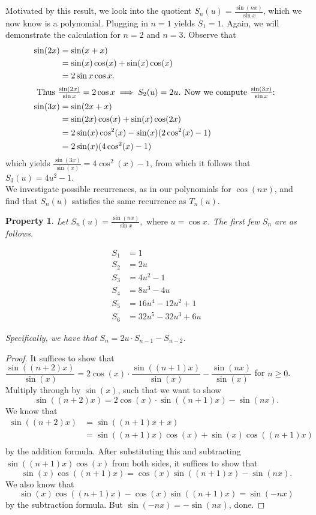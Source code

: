 \documentclass[12pt, letterpaper]{article} %
\newtheorem{theorem}{Property}
\begin{document}
Motivated by this result, we look into the quotient $S_n(u) = \frac{\sin (nx)}{\sin x}$, which we now know is a polynomial. Plugging in $n = 1$ yields $S_1 = 1$. Again, we will demonstrate the calculation for $n = 2$ and $n=3$. Observe that
\begin{align*}
\sin (2x) & = \sin (x + x) \\
 & = \sin (x) \cos(x) + \sin (x)\cos(x) \\
 & = 2\sin x \cos x. \\
\intertext{
Thus $\frac{\sin(2x)}{\sin{x}} = 2\cos x \implies S_2(u) = 2u$. Now we compute $\frac{\sin(3x)}{\sin x}$:
}
\sin(3x) & = \sin(2x + x) \\
    & = \sin(2x) \cos(x) + \sin(x)\cos(2x) \\
    & = 2\sin(x) \cos^2(x) - \sin(x)(2\cos^2(x) - 1) \\
    & = 2\sin(x) (4\cos^2(x) - 1) \\
\end{align*}
which yields $\frac{\sin(3x)}{\sin(x)} = 4\cos^2(x) - 1$, from which it follows that $S_3(u) = 4u^2 - 1$. \\

We investigate possible recurrences, as in our polynomials for $\cos (nx)$, and find that $S_n(u)$ satisfies the same recurrence as $T_n(u)$.

\begin{theorem}
Let $S_{n}(u)=\frac{\sin(nx)}{\sin{x}},\text{ where } u = \cos x$. The first few $S_{n}$ are as follows.

\begin{align*}
S_{1} &= 1 \\
S_{2} &= 2u \\
S_{3} &= 4u^{2} -1 \\
S_{4} &= 8u^{3} - 4u \\
S_{5} &= 16u^{4} - 12u^{2} + 1 \\
S_{6} &= 32u^{5} - 32u^{3} + 6u
\end{align*}

Specifically, we have that $S_{n} = 2u\cdot S_{n-1} - S_{n-2}$.
\end{theorem}

\begin{proof}
It suffices to show that $\dfrac{\sin ((n+2)x)}{\sin(x)} = 2\cos (x) \cdot \dfrac{\sin ((n+1)x)}{\sin (x)} - \dfrac{\sin (nx)}{\sin (x)}$ for $n \ge 0$. Multiply through by $\sin (x)$, such that we want to show
$$\sin ((n+2)x) = 2\cos (x) \cdot \sin ((n+1)x) - \sin (nx).$$
We know that
\begin{align*}
\sin((n+2)x) & = \sin((n+1)x + x) \\
& = \sin((n+1)x)\cos(x) + \sin(x)\cos((n+1)x) \\
\end{align*}
by the addition formula. After substituting this and subtracting $\sin((n+1)x)\cos(x)$ from both sides, it suffices to show that
$$\sin(x) \cos((n+1)x) = \cos(x) \sin ((n+1)x) - \sin(nx).$$
We also know that
$$\sin(x)\cos((n+1)x) - \cos(x)\sin((n+1)x) = \sin(-nx)$$
by the subtraction formula. But $\sin(-nx) = -\sin(nx)$, done.
\end{proof}
\end{document}
